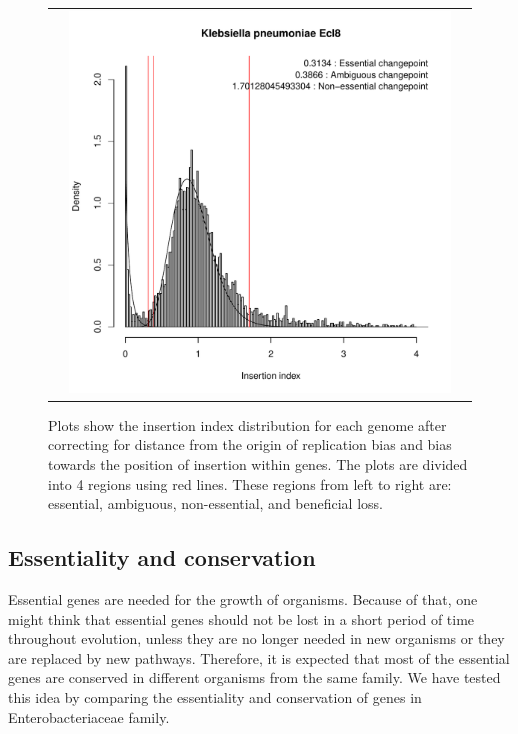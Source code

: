 \documentclass[12pt,letterpaper]{article}
\begin{document}
\begin{figure}
\begin{tabular}{c c c}
&\includegraphics[page=13, scale=0.25]{essentiality-normalised.pdf}&\\
\end{tabular}
\caption{Plots show the insertion index distribution for each genome after correcting for distance from the origin of replication bias and bias towards the position of insertion within genes. The plots are divided into 4 regions using red lines. These regions from left to right are: essential, ambiguous, non-essential, and beneficial loss.}
\label{fig:iidist-species-normalised}
\end{figure}
\subsection{Essentiality and conservation}
Essential genes are needed for the growth of organisms. Because of that, one might think that essential genes should not be lost in a short period of time throughout evolution, unless they are no longer needed in new organisms or they are replaced by new pathways. Therefore, it is expected that most of the essential genes are conserved in different organisms from the same family. We have tested this idea by comparing the essentiality and conservation of genes in Enterobacteriaceae family.
\end{document}
